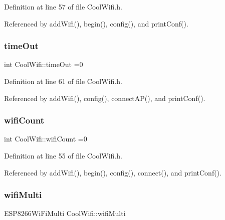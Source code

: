 Definition at line 57 of file Cool\+Wifi.\+h.



Referenced by add\+Wifi(), begin(), config(), and print\+Conf().

\mbox{\label{classCoolWifi_a952111605f25156588b5632caaba1c6f}} 
\subsubsection{\texorpdfstring{time\+Out}{timeOut}}
{\footnotesize\ttfamily int Cool\+Wifi\+::time\+Out =0\hspace{0.3cm}{\ttfamily [private]}}



Definition at line 61 of file Cool\+Wifi.\+h.



Referenced by add\+Wifi(), config(), connect\+A\+P(), and print\+Conf().

\mbox{\label{classCoolWifi_ab133bd92fcb895b884deecd6678592e4}} 
\subsubsection{\texorpdfstring{wifi\+Count}{wifiCount}}
{\footnotesize\ttfamily int Cool\+Wifi\+::wifi\+Count =0\hspace{0.3cm}{\ttfamily [private]}}



Definition at line 55 of file Cool\+Wifi.\+h.



Referenced by add\+Wifi(), begin(), config(), connect(), and print\+Conf().

\mbox{\label{classCoolWifi_a7862a8c0d7239877e2956c14a368aab8}} 
\subsubsection{\texorpdfstring{wifi\+Multi}{wifiMulti}}
{\footnotesize\ttfamily E\+S\+P8266\+Wi\+Fi\+Multi Cool\+Wifi\+::wifi\+Multi\hspace{0.3cm}{\ttfamily [private]}}



